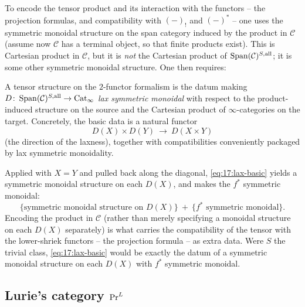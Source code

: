 To encode the tensor product and its interaction with the functors -- the projection
formulas, and compatibility with $(-)_{!}$ and $(-)^{*}$ -- one uses the symmetric monoidal
structure on the span category induced by the product in $\mathcal C$ (assume now
$\mathcal C$ has a terminal object, so that finite products exist). This is Cartesian
product in $\mathcal C$, but it is \emph{not} the Cartesian product of
$\operatorname{Span}(\mathcal C)^{S,\mathrm{all}}$; it is some other symmetric monoidal structure. One
then requires:

\begin{definition}
\label{def:17:lax}
A tensor structure on the $2$-functor formalism is the datum making
$D\colon\operatorname{Span}(\mathcal C)^{S,\mathrm{all}}\to\mathrm{Cat}_{\infty}$ \emph{lax symmetric monoidal} with
respect to the product-induced structure on the source and the Cartesian product of
$\infty$-categories on the target. Concretely, the basic data is a natural functor
\begin{equation}
\label{eq:17:lax-basic}
D(X)\times D(Y)\ \longrightarrow\ D(X\times Y)
\end{equation}
(the direction of the laxness), together with compatibilities conveniently packaged by lax
symmetric monoidality.
\end{definition}

\begin{remark}
\label{rmk:17:unwind-lax}
Applied with $X=Y$ and pulled back along the diagonal, \eqref{eq:17:lax-basic} yields a
symmetric monoidal structure on each $D(X)$, and makes the $f^{*}$ symmetric monoidal:
\begin{equation*}
\bigl\{\text{symmetric monoidal structure on }D(X)\bigr\}\ +\ \bigl\{f^{*}\text{ symmetric monoidal}\bigr\}.
\end{equation*}
Encoding the product in $\mathcal C$ (rather than merely specifying a monoidal structure on
each $D(X)$ separately) is what carries the compatibility of the tensor with the
lower-shriek functors -- the projection formula -- as extra data. Were $S$ the trivial
class, \eqref{eq:17:lax-basic} would be exactly the datum of a symmetric monoidal structure
on each $D(X)$ with $f^{*}$ symmetric monoidal.
\end{remark}

\subsection{Lurie's category \texorpdfstring{$\mathrm{Pr}^{L}$}{PrL}}
\label{subsec:17:PrL}

